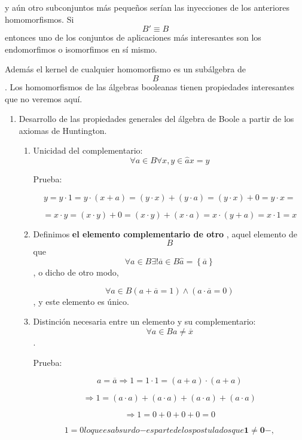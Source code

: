 \begin{enumerate}
  y aún otro subconjuntos más pequeños serían las inyecciones de los
  anteriores homomorfismos. Si \[{B'} \equiv B\]entonces uno de los
  conjuntos de aplicaciones más interesantes son los endomorfimos o
  isomorfimos en sí mismo.

  Además el kernel de cualquier homomorfismo es un subálgebra de \[B\].
  Los homomorfismos de las álgebras booleanas tienen propiedades
  interesantes que no veremos aquí.

  \begin{enumerate}
  \def\labelenumii{\arabic{enumii}.}
  \setcounter{enumii}{3}
  \item
    Desarrollo de las propiedades generales del álgebra de Boole a
    partir de los axiomas de Huntington.

    \begin{enumerate}
    \def\labelenumiii{\arabic{enumiii}.}
    \item
      Unicidad del
      complementario:\[{\forall{a \in B}\forall x,{y \in \widehat{a}}}{x = y}\]

      Prueba:

      \[y{{{{{{= {y \cdot 1}} = {y \cdot {({x + a})}}} = {{({y \cdot x})} + {({y \cdot a})}}} = {{({y \cdot x})} + 0}} = {y \cdot x}} =}\]

      \[{{{{{= {x \cdot y}} = {{({x \cdot y})} + 0}} = {{({x \cdot y})} + {({x \cdot a})}}} = {x \cdot {({y + a})}}} = {x \cdot 1}} = x\]
    \item
      Definimos \textbf{el elemento complementario de otro} , aquel
      elemento de \[B\]
      que\[\forall{a \in B}\exists!{\overline{a} \in B}{\widehat{a} = \left\{ \overline{a} \right\}}\],
      o dicho de otro modo,

      \[\forall{a \in B}{\left( {{a + \overline{a}} = 1} \right) \land \left( {{a \cdot \overline{a}} = 0} \right)}\],
      y este elemento es único.
    \item
      Distinción necesaria entre un elemento y su complementario:
      \[\forall{a \in B}{a \neq \overline{x}}\].

      Prueba:

      \[{a = \overline{a}}\Rightarrow{{1 = {1 \cdot 1}} = {{({a + a})} \cdot {({a + a})}}}\]

      \[\Rightarrow{1 = {{{{({a \cdot a})} + {({a \cdot a})}} + {({a \cdot a})}} + {({a \cdot a})}}}\]

      \[\Rightarrow{{1 = {{{0 + 0} + 0} + 0}} = 0}\]

      \[{1 = 0}\mathit{lo}\mathit{que}\mathit{es}\mathit{absurdo}{- \mathit{es}}\mathit{parte}\mathit{de}\mathit{los}\mathit{postulados}\mathit{que}{\mathbf{1} \neq {\mathbf{0} - ,}}\]


\end{enumerate}
\end{enumerate}
\end{enumerate}
